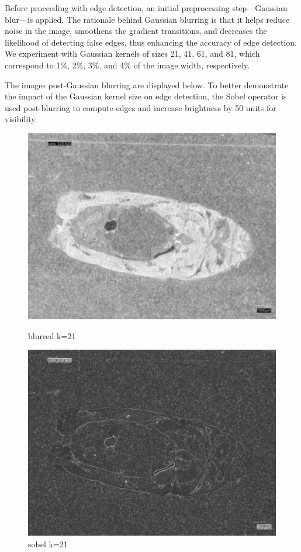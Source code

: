 Before proceeding with edge detection, an initial preprocessing step—Gaussian blur—is applied. The rationale behind Gaussian blurring is that it helps reduce noise in the image, smoothens the gradient transitions, and decreases the likelihood of detecting false edges, thus enhancing the accuracy of edge detection\cite{4.3}. We experiment with Gaussian kernels of sizes 21, 41, 61, and 81, which correspond to 1\%, 2\%, 3\%, and 4\% of the image width, respectively.

The images post-Gaussian blurring are displayed below. To better demonstrate the impact of the Gaussian kernel size on edge detection, the Sobel operator is used post-blurring to compute edges and increase brightness by 50 units for visibility.

\begin{figure}
    \centering
    \begin{minipage}{0.45\textwidth}
        \centering
        \includegraphics[width=\textwidth]{./fig/gausssian/blurred21.jpg}
        \caption{blurred k=21}
        \label{fig:blurred21}
    \end{minipage}
    \begin{minipage}{0.45\textwidth}
        \centering
        \includegraphics[width=\textwidth]{./fig/gausssian/sobel21.jpg}
        \caption{sobel k=21}
        \label{fig:sobel21}
    \end{minipage}
\end{figure}

